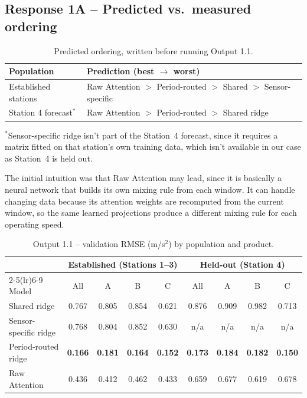 \documentclass[11pt,a4paper]{article}
\begin{document}
\subsection*{Response 1A -- Predicted vs.\ measured ordering}

\begin{table}[H]\centering\small
\caption{Predicted ordering, written before running Output 1.1.}
\label{tab:pred1a}
\begin{tabular}{ll}
\toprule
Population & Prediction (best $\to$ worst)\\
\midrule
Established stations & Raw Attention $>$ Period-routed $>$ Shared $>$ Sensor-specific\\
Station 4 forecast$^{*}$ & Raw Attention $>$ Period-routed $>$ Shared ridge\\
\bottomrule
\end{tabular}

\vspace{2pt}
\parbox{0.9\linewidth}{\footnotesize $^{*}$Sensor-specific ridge isn't part of the Station~4 forecast, since it requires a matrix fitted on that station's own training data, which isn't available in our case as Station~4 is held out.}
\end{table}

The initial intuition was that Raw Attention may lead, since it is basically a neural network that builds its own mixing rule from each window. It can handle changing data because its attention weights are recomputed from the current window, so the same learned projections produce a different mixing rule for each operating speed.

\begin{table}[H]\centering\small
\caption{Output 1.1 -- validation RMSE (m/s$^2$) by population and product.}
\label{tab:out11}
\begin{tabular}{lcccccccc}
\toprule
 & \multicolumn{4}{c}{Established (Stations 1--3)} & \multicolumn{4}{c}{Held-out (Station 4)}\\
\cmidrule(lr){2-5}\cmidrule(lr){6-9}
Model & All & A & B & C & All & A & B & C\\
\midrule
Shared ridge          & 0.767 & 0.805 & 0.854 & 0.621 & 0.876 & 0.909 & 0.982 & 0.713\\
Sensor-specific ridge & 0.768 & 0.804 & 0.852 & 0.630 & n/a & n/a & n/a & n/a\\
Period-routed ridge   & \textbf{0.166} & \textbf{0.181} & \textbf{0.164} & \textbf{0.152} & \textbf{0.173} & \textbf{0.184} & \textbf{0.182} & \textbf{0.150}\\
Raw Attention         & 0.436 & 0.412 & 0.462 & 0.433 & 0.659 & 0.677 & 0.619 & 0.678\\
\bottomrule
\end{tabular}
\end{table}
\end{document}
